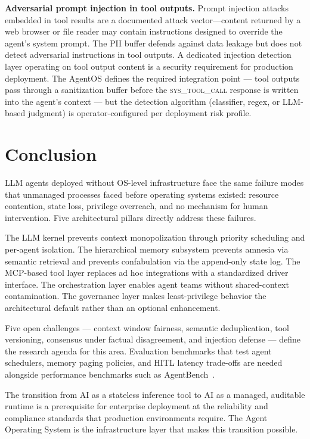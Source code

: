 \documentclass[journal]{IEEEtran}
\begin{document}
\textbf{Adversarial prompt injection in tool outputs.} Prompt injection attacks~\cite{liu2023promptinjection} embedded in tool results are a documented attack vector---content returned by a web browser or file reader may contain instructions designed to override the agent's system prompt. The PII buffer defends against data leakage but does not detect adversarial instructions in tool outputs. A dedicated injection detection layer operating on tool output content is a security requirement for production deployment. The AgentOS defines the required integration point --- tool outputs pass through a sanitization buffer before the \textsc{sys\_tool\_call} response is written into the agent's context --- but the detection algorithm (classifier, regex, or LLM-based judgment) is operator-configured per deployment risk profile.

\section{Conclusion}
\label{sec:conclusion}

LLM agents deployed without OS-level infrastructure face the same failure modes that unmanaged processes faced before operating systems existed: resource contention, state loss, privilege overreach, and no mechanism for human intervention. Five architectural pillars directly address these failures.

The LLM kernel prevents context monopolization through priority scheduling and per-agent isolation. The hierarchical memory subsystem prevents amnesia via semantic retrieval and prevents confabulation via the append-only state log. The MCP-based tool layer replaces ad hoc integrations with a standardized driver interface. The orchestration layer enables agent teams without shared-context contamination. The governance layer makes least-privilege behavior the architectural default rather than an optional enhancement.

Five open challenges --- context window fairness, semantic deduplication, tool versioning, consensus under factual disagreement, and injection defense --- define the research agenda for this area. Evaluation benchmarks that test agent schedulers, memory paging policies, and HITL latency trade-offs are needed alongside performance benchmarks such as AgentBench~\cite{liu2024agentbench}.

The transition from AI as a stateless inference tool to AI as a managed, auditable runtime is a prerequisite for enterprise deployment at the reliability and compliance standards that production environments require. The Agent Operating System is the infrastructure layer that makes this transition possible.
\end{document}
